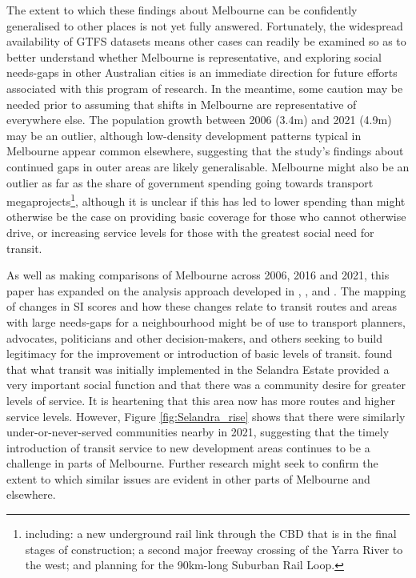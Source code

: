 \documentclass[preprint, 3p,
authoryear]{elsarticle} %
\begin{document}
The extent to which these findings about Melbourne can be confidently
generalised to other places is not yet fully answered. Fortunately, the
widespread availability of GTFS datasets means other cases can readily
be examined so as to better understand whether Melbourne is
representative, and exploring social needs-gaps in other Australian
cities is an immediate direction for future efforts associated with this
program of research. In the meantime, some caution may be needed prior
to assuming that shifts in Melbourne are representative of everywhere
else. The population growth between 2006 (3.4m) and 2021 (4.9m) may be
an outlier, although low-density development patterns typical in
Melbourne appear common elsewhere, suggesting that the study's findings
about continued gaps in outer areas are likely generalisable. Melbourne
might also be an outlier as far as the share of government spending
going towards transport megaprojects\footnote{including: a new
  underground rail link through the CBD that is in the final stages of
  construction; a second major freeway crossing of the Yarra River to
  the west; and planning for the 90km-long Suburban Rail Loop.},
although it is unclear if this has led to lower spending than might
otherwise be the case on providing basic coverage for those who cannot
otherwise drive, or increasing service levels for those with the
greatest social need for transit.

As well as making comparisons of Melbourne across 2006, 2016 and 2021,
this paper has expanded on the analysis approach developed in
\citet{Currie2003Hobart}, \citet{Currie2004Gap},
\citet{Currie2007Identifying} and \citet{currie2010identifying}. The
mapping of changes in SI scores and how these changes relate to transit
routes and areas with large needs-gaps for a neighbourhood might be of
use to transport planners, advocates, politicians and other
decision-makers, and others seeking to build legitimacy for the
improvement or introduction of basic levels of transit.
\citet{delbosc2015impact} found that what transit was initially
implemented in the Selandra Estate provided a very important social
function and that there was a community desire for greater levels of
service. It is heartening that this area now has more routes and higher
service levels. However, Figure \ref{fig:Selandra_rise} shows that there
were similarly under-or-never-served communities nearby in 2021,
suggesting that the timely introduction of transit service to new
development areas continues to be a challenge in parts of Melbourne.
Further research might seek to confirm the extent to which similar
issues are evident in other parts of Melbourne and elsewhere.
\end{document}
